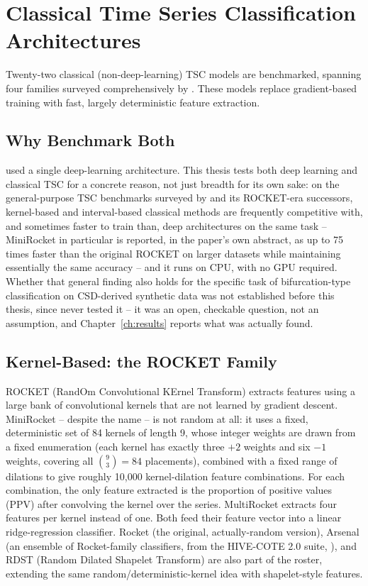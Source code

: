 \section{Classical Time Series Classification Architectures}

Twenty-two classical (non-deep-learning) TSC models are benchmarked, spanning four families surveyed comprehensively by \citet{bagnall2017bakeoff}. These models replace gradient-based training with fast, largely deterministic feature extraction.

\subsection{Why Benchmark Both}
\citet{bury2021} used a single deep-learning architecture. This thesis tests both deep learning and classical TSC for a concrete reason, not just breadth for its own sake: on the general-purpose TSC benchmarks surveyed by \citet{bagnall2017bakeoff} and its ROCKET-era successors, kernel-based and interval-based classical methods are frequently competitive with, and sometimes faster to train than, deep architectures on the same task -- MiniRocket in particular is reported, in the paper's own abstract, as up to 75 times faster than the original ROCKET on larger datasets while maintaining essentially the same accuracy \citep{dempster2021minirocket} -- and it runs on CPU, with no GPU required. Whether that general finding also holds for the specific task of bifurcation-type classification on CSD-derived synthetic data was not established before this thesis, since \citet{bury2021} never tested it -- it was an open, checkable question, not an assumption, and Chapter~\ref{ch:results} reports what was actually found.

\subsection{Kernel-Based: the ROCKET Family}

ROCKET (RandOm Convolutional KErnel Transform) \citep{dempster2020} extracts features using a large bank of convolutional kernels that are not learned by gradient descent. MiniRocket \citep{dempster2021minirocket} -- despite the name -- is not random at all: it uses a fixed, deterministic set of 84 kernels of length 9, whose integer weights are drawn from a fixed enumeration (each kernel has exactly three $+2$ weights and six $-1$ weights, covering all $\binom{9}{3}=84$ placements), combined with a fixed range of dilations to give roughly 10,000 kernel-dilation feature combinations. For each combination, the only feature extracted is the proportion of positive values (PPV) after convolving the kernel over the series. MultiRocket \citep{tan2022multirocket} extracts four features per kernel instead of one. Both feed their feature vector into a linear ridge-regression classifier. Rocket (the original, actually-random version), Arsenal (an ensemble of Rocket-family classifiers, from the HIVE-COTE 2.0 suite, \citealp{middlehurst2021hivecote2}), and RDST (Random Dilated Shapelet Transform) are also part of the roster, extending the same random/deterministic-kernel idea with shapelet-style features.

